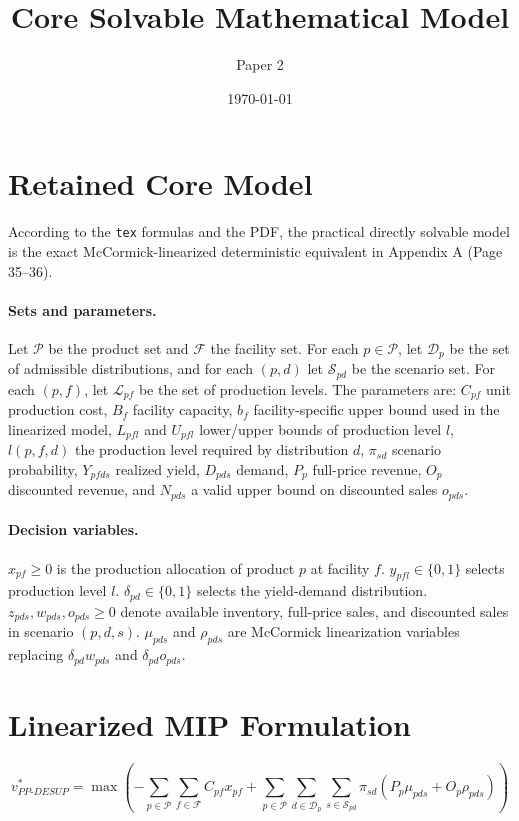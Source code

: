 \documentclass{article}
\title{Core Solvable Mathematical Model}
\author{Paper 2}
\date{\today}
\begin{document}
\maketitle

\section*{Retained Core Model}
According to the \texttt{tex} formulas and the PDF, the practical directly solvable model is the
exact McCormick-linearized deterministic equivalent in Appendix A (Page 35--36).

\paragraph{Sets and parameters.}
Let $\mathcal{P}$ be the product set and $\mathcal{F}$ the facility set. For each
$p \in \mathcal{P}$, let $\mathcal{D}_p$ be the set of admissible distributions, and for each
$(p,d)$ let $\mathcal{S}_{pd}$ be the scenario set. For each $(p,f)$, let $\mathcal{L}_{pf}$ be
the set of production levels. The parameters are:
$C_{pf}$ unit production cost, $B_f$ facility capacity, $b_f$ facility-specific upper bound used
in the linearized model, $L_{pfl}$ and $U_{pfl}$ lower/upper bounds of production level $l$,
$l(p,f,d)$ the production level required by distribution $d$, $\pi_{sd}$ scenario probability,
$Y_{pfds}$ realized yield, $D_{pds}$ demand, $P_p$ full-price revenue, $O_p$ discounted revenue,
and $N_{pds}$ a valid upper bound on discounted sales $o_{pds}$.

\paragraph{Decision variables.}
$x_{pf} \ge 0$ is the production allocation of product $p$ at facility $f$.
$y_{pfl}\in\{0,1\}$ selects production level $l$.
$\delta_{pd}\in\{0,1\}$ selects the yield-demand distribution.
$z_{pds}, w_{pds}, o_{pds} \ge 0$ denote available inventory, full-price sales, and discounted
sales in scenario $(p,d,s)$.
$\mu_{pds}$ and $\rho_{pds}$ are McCormick linearization variables replacing
$\delta_{pd} w_{pds}$ and $\delta_{pd} o_{pds}$.

\section*{Linearized MIP Formulation}
\begin{equation}
v_{PP\text{-}DESUP}^{*}
= \max
\left(
- \sum_{p \in \mathcal{P}} \sum_{f \in \mathcal{F}} C_{pf} x_{pf}
+ \sum_{p \in \mathcal{P}} \sum_{d \in \mathcal{D}_p} \sum_{s \in \mathcal{S}_{pd}}
\pi_{sd}\left( P_p \mu_{pds} + O_p \rho_{pds} \right)
\right)
\tag{22a}
\end{equation}
\end{document}
